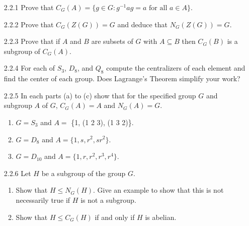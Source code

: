 \begin{enumerate}
   \item[2.2.1]   Prove that
                  $C_G(A) = \{g \in G : g^{-1}ag = a \text{ for all } a \in A\}$.
   \item[2.2.2]   Prove that $C_G(Z(G)) = G$ and deduce that $N_G(Z(G)) = G$.
   \item[2.2.3]   Prove that if $A$ and $B$ are subsets of $G$ with
                  $A \subseteq B$ then $C_G(B)$ is a subgroup of $C_G(A)$.
   \item[2.2.4]   For each of $S_3$, $D_8$, and $Q_8$ compute the centralizers
                  of each element and find the center of each group. Does
                  Lagrange's Theorem simplify your work?
   \item[2.2.5]   In each parts (a) to (c) show that for the specified group $G$
                  and subgroup $A$ of $G$, $C_G(A) = A$ and $N_G(A) = G$.
                  \begin{enumerate}
                     \item $G = S_3$ and $A = $ \{1, (1 2 3), (1 3 2)\}.
                     \item $G = D_8$ and $A = \{1, s, r^2, sr^2\}$.
                     \item $G = D_{10}$ and $A = \{1, r, r^2, r^3, r^4\}$.
                  \end{enumerate}
   \item[2.2.6]   Let $H$ be a subgroup of the group $G$.
                  \begin{enumerate}
                     \item Show that $H \le N_G(H)$. Give an example to show
                           that this is not necessarily true if $H$ is not a
                           subgroup.
                     \item Show that $H \le C_G(H)$ if and only if $H$ is
                           abelian.
                  \end{enumerate}

\end{enumerate}
